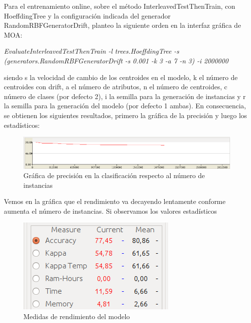 Para el entrenamiento online, sobre el método InterleavedTestThenTrain, con HoeffdingTree y la configuración indicada del generador RandomRBFGeneratorDrift, planteo la siguiente orden en la interfaz gráfica de MOA:

\textit{EvaluateInterleavedTestThenTrain -l trees.HoeffdingTree -s (generators.RandomRBFGeneratorDrift -s 0.001 -k 3 -a 7 -n 3) -i 2000000}

siendo s la velocidad de cambio de los centroides en el modelo, k el número de centroides con drift, a el número de atributos, n el número de centroides, c número de clases (por defecto 2), i la semilla para la generación de instancias y r la semilla para la generación del modelo (por defecto 1 ambas). En consecuencia, se obtienen los siguientes resultados, primero la gráfica de la precisión y luego los estadísticos:

\begin{figure}[H] %
	\centering
	\includegraphics[scale=0.4]{cd1.png}  %
	\caption{Gráfica de precisión en la clasificación respecto al número de instancias} 
	\label{fig:cd1}
\end{figure}

Vemos en la gráfica que el rendimiento va decayendo lentamente conforme aumenta el número de instancias. Si observamos los valores estadísticos

\begin{figure}[H] %
	\centering
	\includegraphics[scale=0.5]{cd2.png}  %
	\caption{Medidas de rendimiento del modelo} 
	\label{fig:cd2}
\end{figure}

